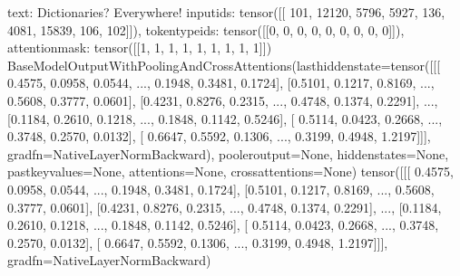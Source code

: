 \documentclass[letterpaper,10pt,english]{jupyterBook}
\begin{document}
\begin{sphinxVerbatimOutput}

\begin{sphinxVerbatim}[commandchars=\\\{\}]
\PYGZob{}\PYGZsq{}text\PYGZsq{}: \PYGZsq{}Dictionaries? Everywhere!\PYGZsq{}\PYGZcb{}
\PYGZob{}\PYGZsq{}input\PYGZus{}ids\PYGZsq{}: tensor([[  101, 12120,  5796,  5927,   136,  4081, 15839,   106,   102]]), \PYGZsq{}token\PYGZus{}type\PYGZus{}ids\PYGZsq{}: tensor([[0, 0, 0, 0, 0, 0, 0, 0, 0]]), \PYGZsq{}attention\PYGZus{}mask\PYGZsq{}: tensor([[1, 1, 1, 1, 1, 1, 1, 1, 1]])\PYGZcb{}
BaseModelOutputWithPoolingAndCrossAttentions(last\PYGZus{}hidden\PYGZus{}state=tensor([[[ 0.4575,  0.0958, \PYGZhy{}0.0544,  ..., \PYGZhy{}0.1948,  0.3481, \PYGZhy{}0.1724],
         [\PYGZhy{}0.5101, \PYGZhy{}0.1217,  0.8169,  ...,  0.5608,  0.3777, \PYGZhy{}0.0601],
         [\PYGZhy{}0.4231,  0.8276, \PYGZhy{}0.2315,  ..., \PYGZhy{}0.4748, \PYGZhy{}0.1374,  0.2291],
         ...,
         [\PYGZhy{}0.1184, \PYGZhy{}0.2610, \PYGZhy{}0.1218,  ..., \PYGZhy{}0.1848,  0.1142, \PYGZhy{}0.5246],
         [ 0.5114, \PYGZhy{}0.0423,  0.2668,  ...,  0.3748,  0.2570, \PYGZhy{}0.0132],
         [ 0.6647,  0.5592, \PYGZhy{}0.1306,  ..., \PYGZhy{}0.3199,  0.4948, \PYGZhy{}1.2197]]],
       grad\PYGZus{}fn=\PYGZlt{}NativeLayerNormBackward\PYGZgt{}), pooler\PYGZus{}output=None, hidden\PYGZus{}states=None, past\PYGZus{}key\PYGZus{}values=None, attentions=None, cross\PYGZus{}attentions=None)
tensor([[[ 0.4575,  0.0958, \PYGZhy{}0.0544,  ..., \PYGZhy{}0.1948,  0.3481, \PYGZhy{}0.1724],
         [\PYGZhy{}0.5101, \PYGZhy{}0.1217,  0.8169,  ...,  0.5608,  0.3777, \PYGZhy{}0.0601],
         [\PYGZhy{}0.4231,  0.8276, \PYGZhy{}0.2315,  ..., \PYGZhy{}0.4748, \PYGZhy{}0.1374,  0.2291],
         ...,
         [\PYGZhy{}0.1184, \PYGZhy{}0.2610, \PYGZhy{}0.1218,  ..., \PYGZhy{}0.1848,  0.1142, \PYGZhy{}0.5246],
         [ 0.5114, \PYGZhy{}0.0423,  0.2668,  ...,  0.3748,  0.2570, \PYGZhy{}0.0132],
         [ 0.6647,  0.5592, \PYGZhy{}0.1306,  ..., \PYGZhy{}0.3199,  0.4948, \PYGZhy{}1.2197]]],
       grad\PYGZus{}fn=\PYGZlt{}NativeLayerNormBackward\PYGZgt{})
\end{sphinxVerbatim}
\end{sphinxVerbatimOutput}
\end{document}
